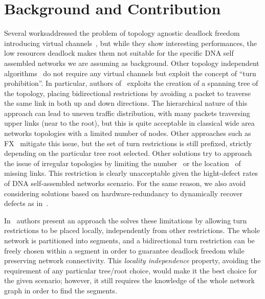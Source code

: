 \section{Background and Contribution}
\label{sec:related_works}
Several worksaddressed the problem of topology agnostic deadlock
freedom introducing virtual channels~\cite{sancho2002, skeie2002,
skeie2004, koibuchi2003}, but while they show interesting
performances, the low resources deadlock makes them not suitable for
the specific DNA self assembled networks we are assuming as
background.
Other topology independent algorithms~\cite{schroeder1991,
koibuchi2001, cherkasova1996} do not require any virtual channels but
exploit the concept of ``turn prohibition''.
In particular, authors of~\cite{Patwardhan05evaluatingthe} exploits the creation of a spanning tree of the
topology, placing bidirectional restrictions by avoiding a packet
to traverse the same link in both up and down directions.
The hierarchical nature of this approach can lead to uneven traffic
distribution, with many packets traversing upper links (near to the
root), but this is quite acceptable in classical wide area networks
topologies with a limited number of nodes. Other approaches such as
FX~\cite{sancho2000} mitigate this
issue, but the set of turn restrictions is still prefixed,
strictly depending on the particular tree root selected. 
Other solutions try to approach the issue of irregular
topologies by limiting the number~\cite{duato1997, gomez2004, koibuchi2008} or the
location~\cite{zhang2008, flich2008, liu2011} of missing links. This
restriction is clearly unacceptable given the hight-defect rates of
DNA self-assembled networks scenario. For the same reason, we also
avoid considering solutions based on hardware-redundancy to
dynamically recover defects as in~\cite{constantinides2006, kohler2010,  park2006, ebrahimi2013}. 

In~\cite{mejia_ipdps06} authors present an approach the solves these
limitations by allowing turn restrictions to be placed locally,
independently from other restrictions. The whole network is
partitioned into segments, and a bidirectional turn
restriction can be freely chosen within a segment in order to guarantee
deadlock freedom while preserving network connectivity. This \emph{locality
independence} property, avoiding the requirement of any particular tree/root
choice, would make it the best choice for the given scenario;
however, it still requires the knowledge of the
whole network graph in order to find the segments. 

